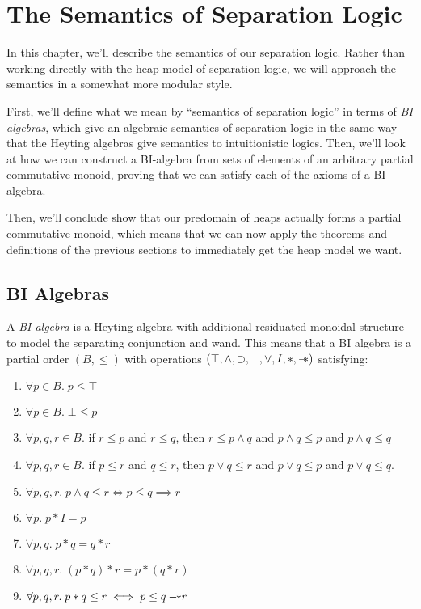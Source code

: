\chapter{The Semantics of Separation Logic}

In this chapter, we'll describe the semantics of our separation logic.
Rather than working directly with the heap model of separation logic,
we will approach the semantics in a somewhat more modular
style. 

First, we'll define what we mean by ``semantics of separation logic''
in terms of \emph{BI algebras}, which give an algebraic semantics of
separation logic in the same way that the Heyting algebras give
semantics to intuitionistic logics. Then, we'll look at how we can
construct a BI-algebra from sets of elements of an arbitrary partial
commutative monoid, proving that we can satisfy each of the axioms of
a BI algebra.

Then, we'll conclude show that our predomain of heaps actually forms a
partial commutative monoid, which means that we can now apply the
theorems and definitions of the previous sections to immediately get the
heap model we want. 

\section{BI Algebras}

A \emph{BI algebra} is a Heyting algebra with additional residuated
monoidal structure to model the separating conjunction and wand. This
means that a BI algebra is a partial order $(B, \leq)$ with operations
$(\top, \land, \supset, \bot, \vee, I, *, -\!\!*)$ satisfying:

\begin{enumerate}
\item $\forall p \in B.\; p \leq \top$
\item $\forall p \in B.\; \bot \leq p$
\item $\forall p,q,r \in B.$ if $r \leq p$ and $r \leq q$, then
      $r \leq p \land q$ and 
      $p \land q \leq p$ and $p \land q \leq q$
\item $\forall p,q,r \in B.$ if $p \leq r$ and $q \leq r$, then
      $p \vee q \leq r$ and
      $p \vee q \leq p$ and $p \vee q \leq q$.
\item $\forall p, q, r.\; p \land q \leq r \iff p \leq q \implies r$
\item $\forall p.\; p * I = p$
\item $\forall p, q.\; p * q = q * r$
\item $\forall p, q, r.\; (p * q) * r = p * (q * r)$
\item $\forall p, q, r.\; p * q \leq r \iff p \leq q -\!\!* r$
\end{enumerate}

